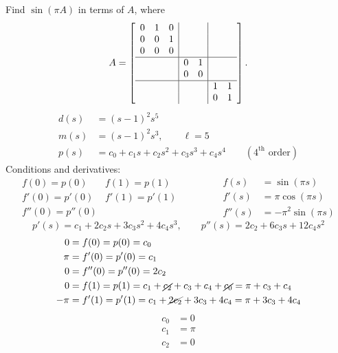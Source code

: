 \begin{example}
Find $\sin(\pi A)$ in terms of $A$, where
\[
A = \left[\begin{array}{ccc|cc|cc}
0&1&0 & & & & \\
0&0&1 & & & & \\
0&0&0 & & & & \\ \hline
 & & & 0&1 & & \\
 & & & 0&0 & & \\ \hline
 & & & & & 1&1\\
 & & & & & 0&1
\end{array}\right].
\]
\begin{align*}
d(s) &= (s-1)^2 s^5\\
m(s) &= (s-1)^2 s^3, \qquad \ell = 5\\
p(s) &= c_0 + c_1s + c_2s^2 + c_3s^3 + c_4s^4 \qquad (4^{\text{th}}\text{ order})
\end{align*}
Conditions and derivatives:
\[
\begin{array}{ll}
f(0) = p(0) & f(1) = p(1)\\
f'(0) = p'(0) & f'(1) = p'(1)\\
f''(0) = p''(0) &
\end{array}
\qquad\qquad
\begin{aligned}
f(s) &= \sin(\pi s)\\
f'(s) &= \pi\cos(\pi s)\\
f''(s) &= -\pi^2\sin(\pi s)
\end{aligned}
\]
\[
p'(s) = c_1 + 2c_2s + 3c_3s^2 + 4c_4s^3, \qquad
p''(s) = 2c_2 + 6c_3s + 12c_4s^2
\]
\begin{align*}
0 &= f(0) = p(0) = c_0\\
\pi &= f'(0) = p'(0) = c_1\\
0 &= f''(0) = p''(0) = 2c_2\\
0 &= f(1) = p(1) = c_1 + \cancel{c_2} + c_3 + c_4 + \cancel{c_0} = \pi + c_3 + c_4\\
-\pi &= f'(1) = p'(1) = c_1 + \cancel{2c_2} + 3c_3 + 4c_4 = \pi + 3c_3 + 4c_4
\end{align*}
\[
\boxed{\begin{aligned} c_0 &= 0\\ c_1 &= \pi\\ c_2 &= 0\end{aligned}}
\]
\end{example}
